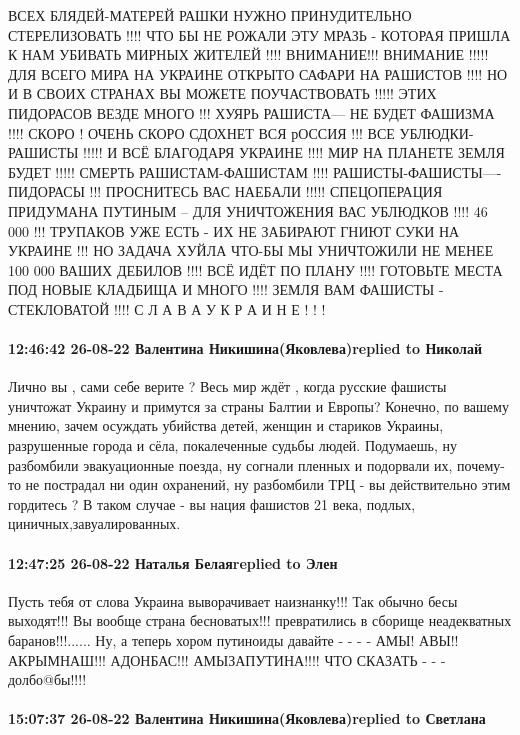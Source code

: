 ВСЕХ БЛЯДЕЙ-МАТЕРЕЙ РАШКИ НУЖНО ПРИНУДИТЕЛЬНО СТЕРЕЛИЗОВАТЬ !!!! ЧТО БЫ НЕ
РОЖАЛИ ЭТУ МРАЗЬ - КОТОРАЯ ПРИШЛА К НАМ УБИВАТЬ МИРНЫХ ЖИТЕЛЕЙ !!!! ВНИМАНИЕ!!!
ВНИМАНИЕ !!!!! ДЛЯ ВСЕГО МИРА НА УКРАИНЕ ОТКРЫТО САФАРИ НА РАШИСТОВ !!!! НО И В
СВОИХ СТРАНАХ ВЫ МОЖЕТЕ ПОУЧАСТВОВАТЬ !!!!! ЭТИХ ПИДОРАСОВ ВЕЗДЕ МНОГО !!!
ХУЯРЬ РАШИСТА--- НЕ БУДЕТ ФАШИЗМА !!!! СКОРО ! ОЧЕНЬ СКОРО СДОХНЕТ ВСЯ рОССИЯ
!!! ВСЕ УБЛЮДКИ-РАШИСТЫ !!!!! И ВСЁ БЛАГОДАРЯ УКРАИНЕ !!!! МИР НА ПЛАНЕТЕ ЗЕМЛЯ
БУДЕТ !!!!! СМЕРТЬ РАШИСТАМ-ФАШИСТАМ !!!! РАШИСТЫ-ФАШИСТЫ----ПИДОРАСЫ !!!
ПРОСНИТЕСЬ ВАС НАЕБАЛИ !!!!! СПЕЦОПЕРАЦИЯ ПРИДУМАНА ПУТИНЫМ -- ДЛЯ УНИЧТОЖЕНИЯ
ВАС УБЛЮДКОВ !!!! 46 000 !!! ТРУПАКОВ УЖЕ ЕСТЬ - ИХ НЕ ЗАБИРАЮТ ГНИЮТ СУКИ НА
УКРАИНЕ !!! НО ЗАДАЧА ХУЙЛА ЧТО-БЫ МЫ УНИЧТОЖИЛИ НЕ МЕНЕЕ 100 000 ВАШИХ ДЕБИЛОВ
!!!! ВСЁ ИДЁТ ПО ПЛАНУ !!!! ГОТОВЬТЕ МЕСТА ПОД НОВЫЕ КЛАДБИЩА И МНОГО !!!!
ЗЕМЛЯ ВАМ ФАШИСТЫ - СТЕКЛОВАТОЙ !!!! С Л А В А У К Р А И Н Е ! ! !

\paragraph{12:46:42 26-08-22 Валентина Никишина(Яковлева)replied to Николай}

Лично вы , сами себе верите ? Весь мир ждёт , когда русские фашисты уничтожат
Украину и примутся за страны Балтии и Европы? Конечно, по вашему мнению, зачем
осуждать убийства детей, женщин и стариков Украины, разрушенные города и сёла,
покалеченные судьбы людей. Подумаешь, ну разбомбили эвакуационные поезда, ну
согнали пленных и подорвали их, почему-то не пострадал ни один охранений, ну
разбомбили ТРЦ - вы действительно этим гордитесь ? В таком случае - вы нация
фашистов 21 века, подлых, циничных,завуалированных.

\paragraph{12:47:25 26-08-22 Наталья Белаяreplied to Элен}

Пусть тебя от слова Украина выворачивает наизнанку!!! Так обычно бесы
выходят!!! Вы вообще страна бесноватых!!! превратились в сборище неадекватных
баранов!!!...... Ну, а теперь хором путиноиды давайте - - - - АМЫ! АВЫ!!
АКРЫМНАШ!!! АДОНБАС!!! АМЫЗАПУТИНА!!!! ЧТО СКАЗАТЬ - - - долбо@бы!!!!

\paragraph{15:07:37 26-08-22 Валентина Никишина(Яковлева)replied to Светлана}

